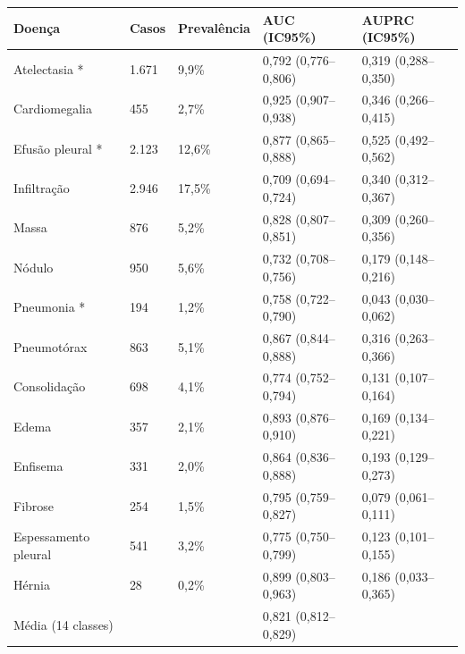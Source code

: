 \begin{tabular}{lllll}
\toprule
Doença & Casos & Prevalência & AUC (IC95\%) & AUPRC (IC95\%) \\
\midrule
Atelectasia * & 1.671 & 9,9\% & 0,792 (0,776–0,806) & 0,319 (0,288–0,350) \\
Cardiomegalia & 455 & 2,7\% & 0,925 (0,907–0,938) & 0,346 (0,266–0,415) \\
Efusão pleural * & 2.123 & 12,6\% & 0,877 (0,865–0,888) & 0,525 (0,492–0,562) \\
Infiltração & 2.946 & 17,5\% & 0,709 (0,694–0,724) & 0,340 (0,312–0,367) \\
Massa & 876 & 5,2\% & 0,828 (0,807–0,851) & 0,309 (0,260–0,356) \\
Nódulo & 950 & 5,6\% & 0,732 (0,708–0,756) & 0,179 (0,148–0,216) \\
Pneumonia * & 194 & 1,2\% & 0,758 (0,722–0,790) & 0,043 (0,030–0,062) \\
Pneumotórax & 863 & 5,1\% & 0,867 (0,844–0,888) & 0,316 (0,263–0,366) \\
Consolidação & 698 & 4,1\% & 0,774 (0,752–0,794) & 0,131 (0,107–0,164) \\
Edema & 357 & 2,1\% & 0,893 (0,876–0,910) & 0,169 (0,134–0,221) \\
Enfisema & 331 & 2,0\% & 0,864 (0,836–0,888) & 0,193 (0,129–0,273) \\
Fibrose & 254 & 1,5\% & 0,795 (0,759–0,827) & 0,079 (0,061–0,111) \\
Espessamento pleural & 541 & 3,2\% & 0,775 (0,750–0,799) & 0,123 (0,101–0,155) \\
Hérnia & 28 & 0,2\% & 0,899 (0,803–0,963) & 0,186 (0,033–0,365) \\
Média (14 classes) &  &  & 0,821 (0,812–0,829) &  \\
\bottomrule
\end{tabular}
